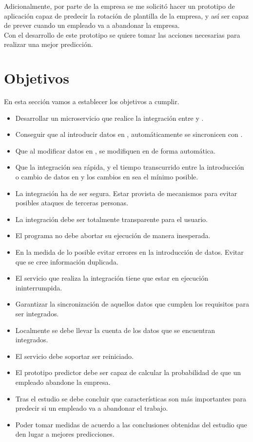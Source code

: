 Adicionalmente, por parte de la empresa se me solicitó hacer un prototipo de aplicación capaz de predecir la rotación de plantilla de la empresa, y así ser capaz de prever cuando un empleado va a abandonar la empresa. \\

Con el desarrollo de este prototipo se quiere tomar las acciones necesarias para realizar una mejor predicción.



\section{Objetivos}

En esta sección vamos a establecer los objetivos a cumplir.

\begin{itemize}
	\item Desarrollar un microservicio que realice la integración entre \hs{} y \wday{}.
	\item Conseguir que al introducir datos en \hs{}, automáticamente se sincronicen con \wday{}.
	\item Que al modificar datos en \hs{}, se modifiquen en \wday{} de forma automática.
	\item Que la integración sea rápida, y el tiempo transcurrido entre la introducción o cambio de datos en \hs{} y los cambios en \wday{} sea el mínimo posible.
	\item La integración ha de ser segura. Estar provista de mecanismos para evitar posibles ataques de terceras personas.
	\item La integración debe ser totalmente transparente para el usuario. 
	\item El programa no debe abortar su ejecución de manera inesperada.
	\item En la medida de lo posible evitar errores en la introducción de datos. Evitar que se cree información duplicada.
	\item El servicio que realiza la integración tiene que estar en ejecución ininterrumpida.
	\item Garantizar la sincronización de aquellos datos que cumplen los requisitos para ser integrados.
	\item Localmente se debe llevar la cuenta de los datos que se encuentran integrados.
	\item El servicio debe soportar ser reiniciado.
	\item El prototipo predictor debe ser capaz de calcular la probabilidad de que un empleado abandone la empresa.
	\item Tras el estudio se debe concluir que características son más importantes para predecir si un empleado va a abandonar el trabajo.
	\item Poder tomar medidas de acuerdo a las conclusiones obtenidas del estudio que den lugar a mejores predicciones.
\end{itemize}


